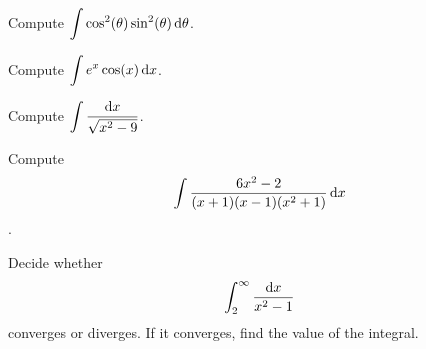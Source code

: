 \documentclass[12pt]{amsart}
\begin{document}
\begin{thm}[20 Points]
  Compute 
    \(\displaystyle{\int \cos^2(\theta)\sin^2(\theta)\dif \theta}\).
\end{thm}

\newpage

\begin{thm}
  Compute
  \(\displaystyle{\int e^x\cos(x)\dif x}\).
\end{thm}

\newpage

\begin{thm}[20 Points]
  Compute \(\displaystyle{\int\frac{\dif x}{\sqrt{x^2 - 9}}}\).
\end{thm}

\newpage

\begin{thm}[20 Points]
  Compute \[\int \frac{6x^2 - 2}{(x + 1)(x - 1)(x^2 + 1)}\dif x\].
\end{thm}

\newpage

\begin{thm}[20 Points]
  Decide whether 
  \[\int_2^\infty \frac{\dif x}{x^2 - 1}\]
  converges or diverges.
  If it converges, find the value of the integral.
\end{thm}



\newpage
\end{document}
